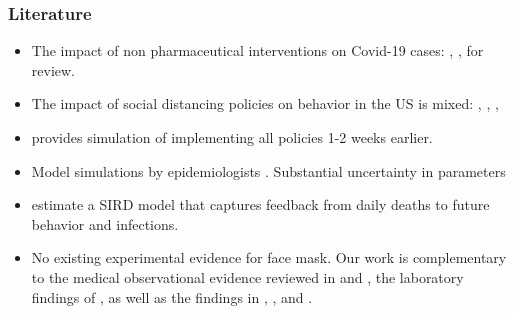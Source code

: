 \documentclass{beamer}
\begin{document}
\begin{frame}
  \frametitle{Literature}%
 
 \footnotesize
\begin{itemize}

\item The impact of non
pharmaceutical interventions on Covid-19  cases:  \cite{hsiang2020},  \cite{courtemanche2020},  \cite{avery2020} for review.

 
\item The impact of social distancing policies on behavior in the US is mixed:  \cite{abouk2020}, \cite{maloney2020},  \cite{gupta2020}, \cite{anderson2020} 

\item \cite{pei2020}  provides simulation of implementing all policies 1-2 weeks earlier.  

\item Model simulations by epidemiologists  \citep[e.g.,][]{ferguson2020}. Substantial uncertainty in parameters  \citep{avery2020,
 stock2020}
 
 \item  \cite{NBERw27128} estimate a SIRD model that captures feedback from daily deaths
to future behavior and infections.

\item No existing experimental evidence for face mask. Our work is complementary to the medical observational evidence reviewed in  \cite{Greenhalghm2020} and \cite{howard2020}, the laboratory findings of \cite{hou2020}, as well as the findings in  \cite{abaluck2020}, \cite{Mitze2020}, and \cite{miyazawa2020}.
  
\end{itemize}

\end{frame}


 

 


\end{document}
